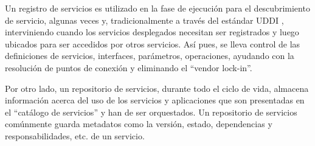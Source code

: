 Un registro de servicios es utilizado en la fase de ejecución para el descubrimiento de servicio, algunas veces y, tradicionalmente a través del estándar UDDI  \cite{Oasis2016-dc}, interviniendo cuando los servicios desplegados necesitan ser registrados y luego ubicados para ser accedidos por otros servicios. Así pues, se lleva control de las definiciones de servicios, interfaces, parámetros, operaciones, ayudando con la resolución de puntos de conexión y eliminando el “vendor lock-in”.

Por otro lado, un repositorio de servicios, durante todo el ciclo de vida, almacena información acerca del uso de los servicios y aplicaciones que son presentadas en el “catálogo de servicios” y han de ser orquestados. Un repositorio de servicios comúnmente guarda metadatos como la versión, estado, dependencias y responsabilidades, etc. de un servicio.
